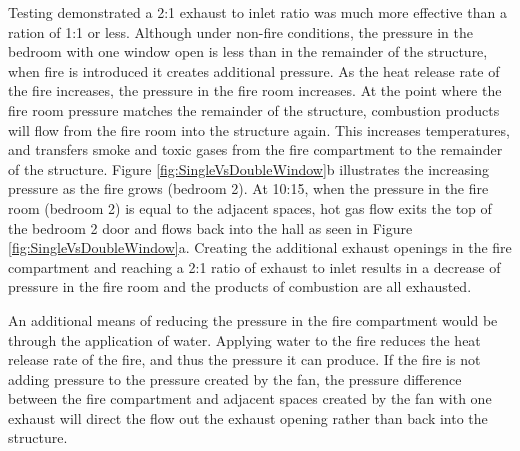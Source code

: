 \documentclass{article}
\begin{document}
Testing demonstrated a 2:1 exhaust to inlet ratio was much more effective than a ration of 1:1 or less. Although under non-fire conditions, the pressure in the bedroom with one window open is less than in the remainder of the structure, when fire is introduced it creates additional pressure. As the heat release rate of the fire increases, the pressure in the fire room increases. At the point where the fire room pressure matches the remainder of the structure, combustion products will flow from the fire room into the structure again. This increases temperatures, and transfers smoke and toxic gases from the fire compartment to the remainder of the structure. Figure \ref{fig:SingleVsDoubleWindow}b illustrates the increasing pressure as the fire grows (bedroom 2). At 10:15, when the pressure in the fire room (bedroom 2) is equal to the adjacent spaces, hot gas flow exits the top of the bedroom 2 door and flows back into the hall as seen in  Figure \ref{fig:SingleVsDoubleWindow}a. Creating the additional exhaust openings in the fire compartment and reaching a 2:1 ratio of exhaust to inlet results in a decrease of pressure in the fire room and the products of combustion are all exhausted. 

An additional means of reducing the pressure in the fire compartment would be through the application of water. Applying water to the fire reduces the heat release rate of the fire, and thus the pressure it can produce. If the fire is not adding pressure to the pressure created by the fan, the pressure difference between the fire compartment and adjacent spaces created by the fan with one exhaust will direct the flow out the exhaust opening rather than back into the structure. 
\end{document}

